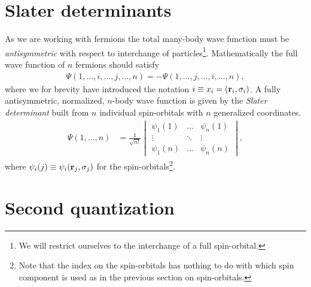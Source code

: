     \section{Slater determinants}
        As we are working with fermions the total many-body wave function must
        be \emph{antisymmetric} with respect to interchange of
        particles\footnote{We will restrict ourselves to the interchange of a
        full spin-orbital.}. Mathematically the full wave function of $n$
        fermions should satisfy
        \begin{align}
            \Psi(1, \dots, i, \dots, j, \dots, n)
            =
            -\Psi(1, \dots, j, \dots, i, \dots, n),
        \end{align}
        where we for brevity have introduced the notation $i \equiv x_i =
        (\mathbf{r}_i, \sigma_i)$. A fully antisymmetric, normalized, $n$-body wave
        function is given by the \emph{Slater determinant} built from $n$
        individual spin-orbitals with $n$ generalized coordinates.
        \begin{align}
            \Psi(1, \dots, n)
            &= \frac{1}{\sqrt{n!}}
            \begin{vmatrix}
                \psi_1(1) & \dots & \psi_n(1) \\
                \vdots & \ddots & \vdots \\
                \psi_1(n) & \dots & \psi_n(n)
            \end{vmatrix},
        \end{align}
        where $\psi_i(j) \equiv \psi_i(\mathbf{r}_j, \sigma_j)$ for the
        spin-orbitals\footnote{Note that the index on the spin-orbitals has
        nothing to do with which spin component is used as in the previous
        section on spin-orbitals.}.

    \section{Second quantization}

